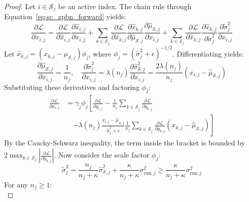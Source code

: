 \documentclass[twocolumn,10pt]{article}
\begin{document}
\begin{proof}
Let $i \in \mathcal{S}_j$ be an active index. The chain rule through Equation~\eqref{eq:sc_zpbn_forward} yields:
\begin{equation*}
\frac{\partial \mathcal{L}}{\partial x_{i,j}} = \frac{\partial \mathcal{L}}{\partial \hat{x}_{i,j}}\frac{\partial \hat{x}_{i,j}}{\partial x_{i,j}} + \sum_{k \in \mathcal{S}_j}\frac{\partial \mathcal{L}}{\partial \hat{x}_{k,j}}\frac{\partial \hat{x}_{k,j}}{\partial \hat{\mu}_{\mathcal{S}, j}}\frac{\partial \hat{\mu}_{\mathcal{S}, j}}{\partial x_{i,j}} + \sum_{k \in \mathcal{S}_j}\frac{\partial \mathcal{L}}{\partial \hat{x}_{k,j}}\frac{\partial \hat{x}_{k,j}}{\partial \tilde{\sigma}_j^2}\frac{\partial \tilde{\sigma}_j^2}{\partial x_{i,j}}
\end{equation*}
Let $\hat{x}_{k,j} = (x_{k,j} - \hat{\mu}_{\mathcal{S}, j})\phi_j$, where $\phi_j = (\tilde{\sigma}_j^2 + \epsilon)^{-1/2}$. Differentiating yields:
\begin{equation*}
\frac{\partial \hat{\mu}_{\mathcal{S}, j}}{\partial x_{i,j}} = \frac{1}{n_j}, \quad \frac{\partial \tilde{\sigma}_j^2}{\partial x_{i,j}} = \lambda(n_j)\frac{\partial \hat{\sigma}_{\mathcal{S}, j}^2}{\partial x_{i,j}} = \frac{2\lambda(n_j)}{n_j}(x_{i,j} - \hat{\mu}_{\mathcal{S}, j})
\end{equation*}
Substituting these derivatives and factoring $\phi_j$:
\begin{align*}
\frac{\partial \mathcal{L}}{\partial x_{i,j}} &= \gamma_j \phi_j \left[ \frac{\partial \mathcal{L}}{\partial y_{i,j}} - \frac{1}{n_j}\sum_{k \in \mathcal{S}_j}\frac{\partial \mathcal{L}}{\partial y_{k,j}} \right. \\
&\quad \left. - \lambda(n_j)\frac{x_{i,j} - \hat{\mu}_{\mathcal{S}, j}}{\tilde{\sigma}_j^2 + \epsilon} \frac{1}{n_j}\sum_{k \in \mathcal{S}_j} \frac{\partial \mathcal{L}}{\partial y_{k,j}}(x_{k,j} - \hat{\mu}_{\mathcal{S}, j}) \right]
\end{align*}
By the Cauchy-Schwarz inequality, the term inside the bracket is bounded by $2 \max_{k \in \mathcal{S}_j} |\frac{\partial \mathcal{L}}{\partial y_{k,j}}|$. Now consider the scale factor $\phi_j$:
\begin{equation*}
\tilde{\sigma}_j^2 = \frac{n_j}{n_j + \kappa}\hat{\sigma}_{\mathcal{S}, j}^2 + \frac{\kappa}{n_j + \kappa}\sigma_{\mathrm{run}, j}^2 \ge \frac{\kappa}{n_j + \kappa}\sigma_{\mathrm{run}, j}^2
\end{equation*}
For any $n_j \ge 1$:
\begin{equation*}

\end{equation*}
\end{proof}
\end{document}
